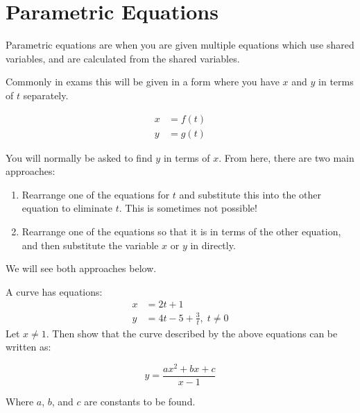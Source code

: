 \section{Parametric Equations}
Parametric equations are when you are given multiple equations which use shared variables, and are calculated from the shared variables.

Commonly in exams this will be given in a form where you have $x$ and $y$ in terms of $t$ separately.

\begin{align*}
    x &= f(t)\\
    y &= g(t)
\end{align*}

You will normally be asked to find $y$ in terms of $x$. 
From here, there are two main approaches:
\begin{enumerate}
    \item Rearrange one of the equations for $t$ and substitute this into the other equation to eliminate $t$. This is sometimes not possible!
    \item Rearrange one of the equations so that it is in terms of the other equation, and then substitute the variable $x$ or $y$ in directly.
\end{enumerate}

We will see both approaches below.

\begin{example}
    A curve has equations:
    \begin{align*}
        x &= 2t + 1 \\
        y &= 4t - 5 + \frac{3}{t}, \; t\neq 0
    \end{align*}
    Let $x \neq 1$. Then show that the curve described by the above equations can be written as:

    \[ y = \frac{ax^2 + bx + c}{x-1}\]

    Where $a$, $b$, and $c$ are constants to be found.
\end{example}

